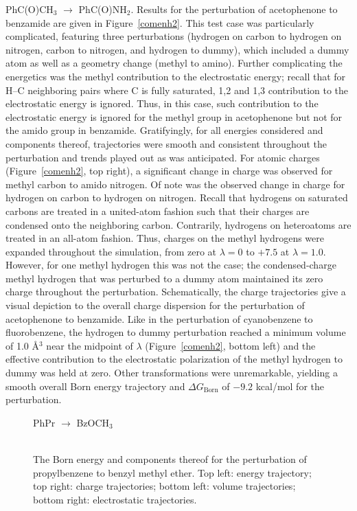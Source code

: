 \documentclass[12pt]{report}
\def\figlab{Figure}\def\figslab{\figlab s}
\newcommand*\fig[1]{\figlab~\ref{#1}}
\begin{document}
PhC(O)CH$_3$  $\longrightarrow$ PhC(O)NH$_2$. Results for the perturbation of acetophenone to benzamide are given in \fig{comenh2}. This test case was particularly complicated, featuring three perturbations (hydrogen on carbon to hydrogen on nitrogen, carbon to nitrogen, and hydrogen to dummy), which included a dummy atom as well as a geometry change (methyl to amino). Further complicating the energetics was the methyl contribution to the electrostatic energy; recall that for H--C neighboring pairs where C is fully saturated, 1,2 and 1,3 contribution to the electrostatic energy is ignored. Thus, in this case, such contribution to the electrostatic energy is ignored for the methyl group in acetophenone but not for the amido group in benzamide. Gratifyingly, for all energies considered and components thereof, trajectories were smooth and consistent throughout the perturbation and trends played out as was anticipated. For atomic charges (\fig{comenh2}, top right), a significant change in charge was observed for methyl carbon to amido nitrogen. Of note was the observed change in charge for hydrogen on carbon to hydrogen on nitrogen. Recall that hydrogens on saturated carbons are treated in a united-atom fashion such that their charges are condensed onto the neighboring carbon. Contrarily, hydrogens on heteroatoms are treated in an all-atom fashion. Thus, charges on the methyl hydrogens were expanded throughout the simulation, from zero at $\lambda = 0$ to $+7.5$ at $\lambda = 1.0$. However, for one methyl hydrogen this was not the case; the condensed-charge methyl hydrogen that was perturbed to a dummy atom maintained its zero charge throughout the perturbation. Schematically, the charge trajectories give a visual depiction to the overall charge dispersion for the perturbation of acetophenone to benzamide. Like in the perturbation of cyanobenzene to fluorobenzene, the hydrogen to dummy perturbation reached a minimum volume of 1.0 \AA$^{3}$ near the midpoint of $\lambda$ (\fig{comenh2}, bottom left) and the effective contribution to the electrostatic polarization of the methyl hydrogen to dummy was held at zero. Other transformations were unremarkable, yielding a smooth overall Born energy trajectory and $\Delta G_{ \textrm{Born}}$ of $-9.2$ kcal/mol for the perturbation.


\begin{figure}[t!]
\centering
PhPr $\longrightarrow$ BzOCH$_3$\\
\hspace*{-1.3cm}\\
\hspace*{-1.3cm}
\caption{The Born energy and components thereof for the perturbation of propylbenzene to benzyl methyl ether. Top left: energy trajectory; top right: charge trajectories; bottom left: volume trajectories; bottom right: electrostatic trajectories.}
\label{prmom}
\end{figure}
\end{document}
